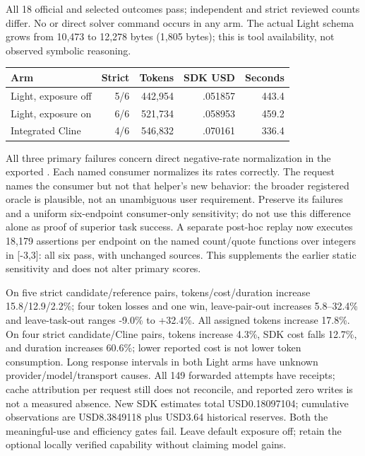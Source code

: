 \documentclass[11pt,a4paper]{article}
\newcommand{\code}[1]{\texttt{\detokenize{#1}}}
\begin{document}
All 18 official and selected outcomes pass; independent and strict reviewed
counts differ. No \code{analyze} or direct solver command occurs in any arm.
The actual Light schema grows from 10,473 to 12,278 bytes (1,805 bytes); this
is tool availability, not observed symbolic reasoning.
\begin{center}\begin{tabular}{lrrrr}
\toprule Arm & Strict & Tokens & SDK USD & Seconds \\\midrule
Light, exposure off & 5/6 & 442,954 & .051857 & 443.4 \\
Light, exposure on & 6/6 & 521,734 & .058953 & 459.2 \\
Integrated Cline & 4/6 & 546,832 & .070161 & 336.4 \\\bottomrule
\end{tabular}\end{center}
All three primary failures concern direct negative-rate normalization in the
exported \code{tierCost}. Each named consumer normalizes its rates correctly.
The request names the consumer but not that helper's new behavior: the broader
registered oracle is plausible, not an unambiguous user requirement. Preserve
its failures and a uniform six-endpoint consumer-only sensitivity; do not use
this difference alone as proof of superior task success. A separate post-hoc
replay now executes 18,179 assertions per endpoint on the named count/quote
functions over integers in [-3,3]: all six pass, with unchanged sources. This
supplements the earlier static sensitivity and does not alter primary scores.

On five strict candidate/reference pairs, tokens/cost/duration increase
15.8/12.9/2.2\%; four token losses and one win, leave-pair-out increases
5.8--32.4\% and leave-task-out ranges -9.0\% to +32.4\%. All assigned tokens
increase 17.8\%. On four strict candidate/Cline pairs, tokens increase 4.3\%,
SDK cost falls 12.7\%, and duration increases 60.6\%; lower reported cost is
not lower token consumption. Long response intervals in both Light arms have
unknown provider/model/transport causes. All 149 forwarded attempts have
receipts; cache attribution per request still does not reconcile, and reported
zero writes is not a measured absence. New SDK estimates total USD0.18097104;
cumulative observations are USD8.3849118 plus USD3.64 historical reserves.
Both the meaningful-use and efficiency gates fail. Leave default exposure off;
retain the optional locally verified capability without claiming model gains.
\end{document}
